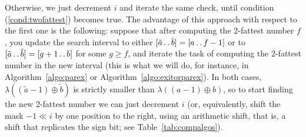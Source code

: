 \documentclass[a4paper]{article}
\newcommand{\?}{\mskip1.5mu}
\def\..{\,\mathpunct{\ldotp\ldotp}} %
\begin{document}
\begin{center}
\end{center}
Otherwise, we just decrement $i$ and iterate the same check, until condition (\ref{cond:twofattest})
becomes true. 
The advantage of this approach with respect
to the first one is the following: suppose that after computing the 2-fattest number $f$, you update the
search interval to either $[\tilde a\..\tilde b]=[a\..f-1]$ or to $[\tilde a\..\tilde b]=[g+1\..b]$ for some $g\geq f$, and iterate the task of computing the 2-fattest
number in the new interval (this is what we will do, for instance, in Algorithm~\ref{algo:parex} or Algorithm~\ref{algo:exitorparex}).
In both cases, $\lambda((\tilde a-1)\oplus \tilde b)$ is strictly smaller than $\lambda((a-1)\oplus b)$, so to start
finding the new 2-fattest number we can just decrement $i$ (or, equivalently, shift the mask $-1\ll i$ by
one position to the right, using an arithmetic shift, that is, a shift that replicates the sign bit; see Table~\ref{tab:compalgos}).
\end{document}
